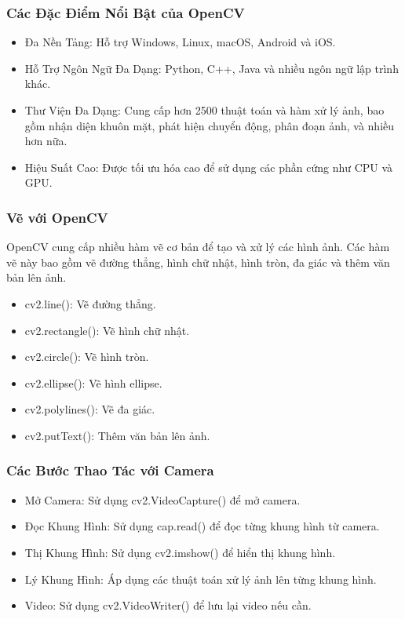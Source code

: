 \begin{flushleft}
    \subsubsection{Các Đặc Điểm Nổi Bật của OpenCV}
    \begin{itemize}
        \item Đa Nền Tảng: Hỗ trợ Windows, Linux, macOS, Android và iOS.
        \item Hỗ Trợ Ngôn Ngữ Đa Dạng: Python, C++, Java và nhiều ngôn ngữ lập trình khác.
        \item Thư Viện Đa Dạng: Cung cấp hơn 2500 thuật toán và hàm xử lý ảnh, bao gồm nhận diện khuôn mặt, phát hiện chuyển động, phân đoạn ảnh, và nhiều hơn nữa.
        \item Hiệu Suất Cao: Được tối ưu hóa cao để sử dụng các phần cứng như CPU và GPU.
    \end{itemize}
    \subsubsection{Vẽ với OpenCV}
    OpenCV cung cấp nhiều hàm vẽ cơ bản để tạo và xử lý các hình ảnh. Các hàm vẽ này bao gồm vẽ đường thẳng, hình chữ nhật, hình tròn, đa giác và thêm văn bản lên ảnh.\\
    \begin{itemize}
        \item cv2.line(): Vẽ đường thẳng.
        \item cv2.rectangle(): Vẽ hình chữ nhật.
        \item cv2.circle(): Vẽ hình tròn.
        \item cv2.ellipse(): Vẽ hình ellipse.
        \item cv2.polylines(): Vẽ đa giác.
        \item cv2.putText(): Thêm văn bản lên ảnh.
    \end{itemize}
    \subsubsection{Các Bước Thao Tác với Camera}
    \begin{itemize}
        \item Mở Camera: Sử dụng cv2.VideoCapture() để mở camera.
        \item Đọc Khung Hình: Sử dụng cap.read() để đọc từng khung hình từ camera.
        \item Thị Khung Hình: Sử dụng cv2.imshow() để hiển thị khung hình.
        \item Lý Khung Hình: Áp dụng các thuật toán xử lý ảnh lên từng khung hình.
        \item Video: Sử dụng cv2.VideoWriter() để lưu lại video nếu cần.
    \end{itemize}

\end{flushleft}
